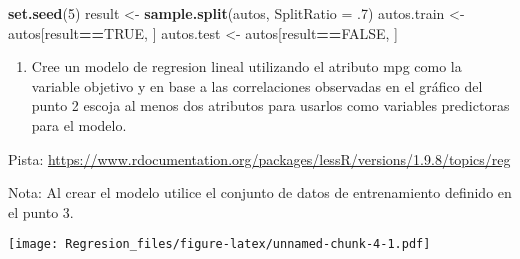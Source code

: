 \documentclass[]{article}
\newenvironment{Shaded}{\begin{snugshade}}{\end{snugshade}}
\newcommand{\CommentTok}[1]{\textcolor[rgb]{0.56,0.35,0.01}{\textit{#1}}}
\newcommand{\DataTypeTok}[1]{\textcolor[rgb]{0.13,0.29,0.53}{#1}}
\newcommand{\DecValTok}[1]{\textcolor[rgb]{0.00,0.00,0.81}{#1}}
\newcommand{\FloatTok}[1]{\textcolor[rgb]{0.00,0.00,0.81}{#1}}
\newcommand{\KeywordTok}[1]{\textcolor[rgb]{0.13,0.29,0.53}{\textbf{#1}}}
\newcommand{\NormalTok}[1]{#1}
\newcommand{\OperatorTok}[1]{\textcolor[rgb]{0.81,0.36,0.00}{\textbf{#1}}}
\newcommand{\OtherTok}[1]{\textcolor[rgb]{0.56,0.35,0.01}{#1}}
\newcommand{\StringTok}[1]{\textcolor[rgb]{0.31,0.60,0.02}{#1}}
\providecommand{\tightlist}{%
  \setlength{\itemsep}{0pt}\setlength{\parskip}{0pt}}
\begin{document}
\begin{Shaded}
\begin{Highlighting}[]
\KeywordTok{set.seed}\NormalTok{(}\DecValTok{5}\NormalTok{)}
\NormalTok{result <-}\StringTok{ }\KeywordTok{sample.split}\NormalTok{(autos, }\DataTypeTok{SplitRatio =} \FloatTok{.7}\NormalTok{)}
\NormalTok{autos.train <-}\StringTok{ }\NormalTok{autos[result}\OperatorTok{==}\OtherTok{TRUE}\NormalTok{, ]}
\NormalTok{autos.test <-}\StringTok{ }\NormalTok{autos[result}\OperatorTok{==}\OtherTok{FALSE}\NormalTok{, ]}
\end{Highlighting}
\end{Shaded}

\begin{enumerate}
\def\labelenumi{\arabic{enumi}.}
\setcounter{enumi}{3}
\tightlist
\item
  Cree un modelo de regresion lineal utilizando el atributo mpg como la
  variable objetivo y en base a las correlaciones observadas en el
  gráfico del punto 2 escoja al menos dos atributos para usarlos como
  variables predictoras para el modelo.
\end{enumerate}

Pista:
\url{https://www.rdocumentation.org/packages/lessR/versions/1.9.8/topics/reg}

Nota: Al crear el modelo utilice el conjunto de datos de entrenamiento
definido en el punto 3.

\begin{Shaded}
\end{Shaded}

\texttt{[image: Regresion\_files/figure-latex/unnamed-chunk-4-1.pdf]}

\begin{Shaded}
\end{Shaded}
\end{document}

